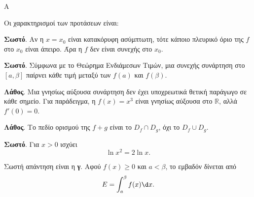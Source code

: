 \begin{thema}{Α}
\begin{erwthma}
\item {}

\item {}

\item {}

\item Οι χαρακτηρισμοί των προτάσεων είναι:
\begin{alist}
\item \textbf{Σωστό}. Αν η $x=x_0$ είναι κατακόρυφη ασύμπτωτη, τότε κάποιο πλευρικό όριο της $f$ στο $x_0$ είναι άπειρο. Άρα η $f$ δεν είναι συνεχής στο $x_0$.
\item \textbf{Σωστό}. Σύμφωνα με το Θεώρημα Ενδιάμεσων Τιμών, μια συνεχής συνάρτηση στο $[a,\beta]$ παίρνει κάθε τιμή μεταξύ των $f(a)$ και $f(\beta)$.
\item \textbf{Λάθος}. Μια γνησίως αύξουσα συνάρτηση δεν έχει υποχρεωτικά θετική παράγωγο σε κάθε σημείο. Για παράδειγμα, η $f(x)=x^3$ είναι γνησίως αύξουσα στο $\mathbb{R}$, αλλά $f'(0)=0$.
\item \textbf{Λάθος}. Το πεδίο ορισμού της $f+g$ είναι το $D_f\cap D_g$, όχι το $D_f\cup D_g$.
\item \textbf{Σωστό}. Για $x>0$ ισχύει
\[ \ln{x^2}=2\ln{x}. \]
\end{alist}

\item Σωστή απάντηση είναι η \textbf{γ}. Αφού $f(x)\ge0$ και $a<\beta$, το εμβαδόν δίνεται από
\[ E=\dint_a^\beta f(x)\d x. \]
\end{erwthma}
\end{thema}

